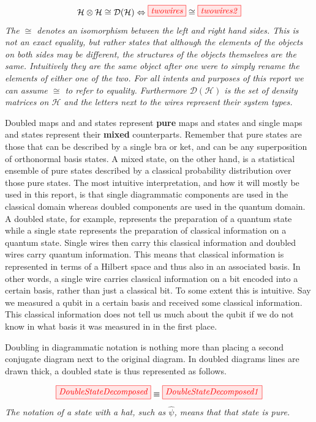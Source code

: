 \documentclass[]{article}
\begin{document}
\begin{equation}
\mathcal{H} \otimes \mathcal{H} \cong \mathcal{D}(\mathcal{H}) \Leftrightarrow \tikzfig{twowires} \cong \tikzfig{twowires2}
\end{equation}
\textit{The $\cong$ denotes an isomorphism between the left and right hand sides. This is not an exact equality, but rather states that although the elements of the objects on both sides may be different, the structures of the objects themselves are the same. Intuitively they are the same object after one were to simply rename the elements of either one of the two. For all intents and purposes of this report we can assume $\cong$ to refer to equality. Furthermore $\mathcal{D}(\mathcal{H})$ is the set of density matrices on $\mathcal{H}$ and the letters next to the wires represent their system types.}

Doubled maps and and states represent \textbf{pure} maps and states and single maps and states represent their \textbf{mixed} counterparts. Remember that pure states are those that can be described by a single bra or ket, and can be any superposition of orthonormal basis states. A mixed state, on the other hand, is a statistical ensemble of pure states described by a classical probability distribution over those pure states. The most intuitive interpretation, and how it will mostly be used in this report, is that single diagrammatic components are used in the classical domain whereas doubled components are used in the quantum domain. A doubled state, for example, represents the preparation of a quantum state while a single state represents the preparation of classical information on a quantum state. Single wires then carry this classical information and doubled wires carry quantum information. This means that classical information is represented in terms of a Hilbert space and thus also in an associated basis. In other words, a single wire carries classical information on a bit encoded into a certain basis, rather than just a classical bit. To some extent this is intuitive. Say we measured a qubit in a certain basis and received some classical information. This classical information does not tell us much about the qubit if we do not know in what basis it was measured in in the first place.

Doubling in diagrammatic notation is nothing more than placing a second conjugate diagram
next to the original diagram. In doubled diagrams lines are drawn thick, a doubled state is thus
represented as follows.

\begin{equation}
	\label{equation:doubledstate}
	\tikzfig{DoubleStateDecomposed} \equiv \tikzfig{DoubleStateDecomposed1}
\end{equation}
\textit{The notation of a state with a hat, such as $\hat{\psi}$, means that that state is pure.}
\end{document}
